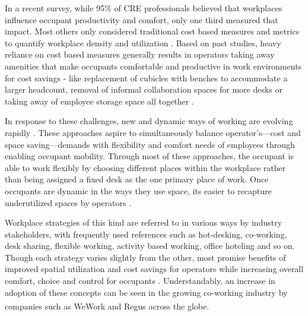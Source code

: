 \documentclass[]{interact}
\theoremstyle{plain}%
\theoremstyle{definition}
\theoremstyle{remark}
\begin{document}
In a recent survey, while 95\% of CRE professionals believed that workplaces influence occupant productivity and comfort, only one third measured that impact. Most others only considered traditional cost based measures and metrics to quantify workplace density and utilization \citep{gensler}. Based on past studies, heavy reliance on cost based measures generally results in operators taking away amenities that make occupants comfortable and productive in work environments for cost savings - like replacement of cubicles with benches to accommodate a larger headcount, removal of informal collaboration spaces for more desks or taking away of employee storage space all together \citep{cbre}.

 

In response to these challenges, new and dynamic ways of working are evolving rapidly . These approaches aspire to simultaneously balance operator's---cost and space saving---demands with flexibility and comfort needs of employees through enabling occupant mobility. Through most of these approaches, the occupant is able to work flexibly by choosing different places within the workplace rather than being assigned a fixed desk as the one primary place of work. Once occupants are dynamic in the ways they use space, its easier to recapture underutilized spaces by operators \citep{cbre}.


Workplace strategies of this kind are referred to in various ways by industry stakeholders, with frequently used references such as hot-desking, co-working, desk sharing, flexible working, activity based working, office hoteling and so on. Though each strategy varies slightly from the other, most promise benefits of improved spatial utilization and cost savings for operators while increasing overall comfort, choice and control for occupants \citep{Engelen2018IsReview}. Understandably, an increase in adoption of these concepts can be seen in the growing co-working industry by companies such as WeWork\textsuperscript{\textregistered} and Regus\textsuperscript{\textregistered} across the globe.  %
\end{document}
